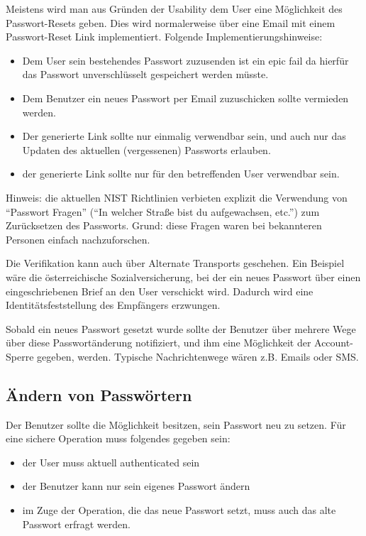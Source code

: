 Meistens wird man aus Gründen der Usability dem User eine Möglichkeit des Passwort-Resets geben. Dies wird normalerweise über eine Email mit einem Passwort-Reset Link implementiert. Folgende Implementierungshinweise:

\begin{itemize}
	\item Dem User sein bestehendes Passwort zuzusenden ist ein epic fail da hierfür das Passwort unverschlüsselt gespeichert werden müsste.
	\item Dem Benutzer ein neues Passwort per Email zuzuschicken sollte vermieden werden.
	\item Der generierte Link sollte nur einmalig verwendbar sein, und auch nur das Updaten des aktuellen (vergessenen) Passworts erlauben.
	\item der generierte Link sollte nur für den betreffenden User verwendbar sein.
\end{itemize}

Hinweis: die aktuellen NIST Richtlinien verbieten explizit die Verwendung von ``Passwort Fragen'' (``In welcher Straße bist du aufgewachsen, etc.'') zum Zurücksetzen des Passworts. Grund: diese Fragen waren bei bekannteren Personen einfach nachzuforschen.

Die Verifikation kann auch über Alternate Transports geschehen. Ein Beispiel wäre die österreichische Sozialversicherung, bei der ein neues Passwort über einen eingeschriebenen Brief an den User verschickt wird. Dadurch wird eine Identitätsfeststellung des Empfängers erzwungen.

Sobald ein neues Passwort gesetzt wurde sollte der Benutzer über mehrere Wege über diese Passwortänderung notifiziert, und ihm eine Möglichkeit der Account-Sperre gegeben, werden. Typische Nachrichtenwege wären z.B. Emails oder SMS.

\subsection{Ändern von Passwörtern}

Der Benutzer sollte die Möglichkeit besitzen, sein Passwort neu zu setzen. Für eine sichere Operation muss folgendes gegeben sein:

\begin{itemize}
	\item der User muss aktuell authenticated sein
	\item der Benutzer kann nur sein eigenes Passwort ändern
	\item im Zuge der Operation, die das neue Passwort setzt, muss auch das alte Passwort erfragt werden.
\end{itemize}

